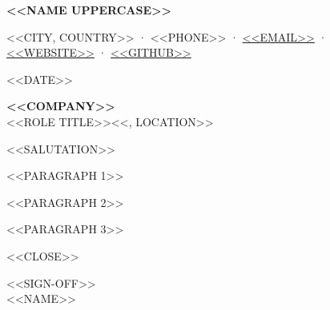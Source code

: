 \documentclass[11pt,a4paper]{article}
\begin{document}
{\fontsize{18}{20}\selectfont\bfseries <<NAME UPPERCASE>>}\par\vspace{-4pt}
{\fontsize{9}{11}\selectfont <<CITY, COUNTRY>>  ·  <<PHONE>>  ·  \href{mailto:<<EMAIL>>}{<<EMAIL>>}  ·  \href{<<WEBSITE URL>>}{<<WEBSITE>>}  ·  \href{<<GITHUB URL>>}{<<GITHUB>>}}\par
\vspace{10pt}
<<DATE>>\par
\textbf{<<COMPANY>>}\\
<<ROLE TITLE>><<, LOCATION>>\par
\vspace{4pt}
<<SALUTATION>>\par
<<PARAGRAPH 1>>\par
<<PARAGRAPH 2>>\par
<<PARAGRAPH 3>>\par
<<CLOSE>>\par
\vspace{6pt}
<<SIGN-OFF>>\\
<<NAME>>
\end{document}
